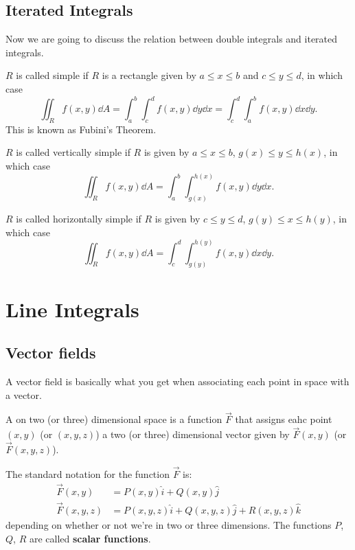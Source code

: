 \section{Iterated Integrals}
Now we are going to discuss the relation between double integrals and iterated integrals.

$R$ is called simple if $R$ is a rectangle given by $a\le x\le b$ and $c\le y\le d$, in which case
\[ \iint_Rf(x,y)\dd{A}=\int_a^b\int_c^df(x,y)\dd{y}\dd{x}=\int_c^d\int_a^bf(x,y)\dd{x}\dd{y}. \]
This is known as Fubini's Theorem.

$R$ is called vertically simple if $R$ is given by $a\le x\le b$, $g(x)\le y\le h(x)$, in which case
\[ \iint_Rf(x,y)\dd{A}=\int_a^b\int_{g(x)}^{h(x)}f(x,y)\dd{y}\dd{x}. \]

$R$ is called horizontally simple if $R$ is given by $c\le y\le d$, $g(y)\le x\le h(y)$, in which case
\[ \iint_Rf(x,y)\dd{A}=\int_c^d\int_{g(y)}^{h(y)}f(x,y)\dd{x}\dd{y}. \]

\pagebreak

\chapter{Line Integrals}
\section{Vector fields}
A vector field is basically what you get when associating each point in space with a vector.

\begin{definition}
A  on two (or three) dimensional space is a function $\vec{F}$ that assigns eahc point $(x,y)$ (or $(x,y,z)$) a two (or three) dimensional vector given by $\vec{F}(x,y)$ (or $\vec{F}(x,y,z)$).
\end{definition}

The standard notation for the function $\vec{F}$ is:
\begin{align*}
\vec{F}(x,y) &= P(x,y)\hat{i} + Q(x,y)\hat{j} \\
\vec{F}(x,y,z) &= P(x,y,z)\hat{i} + Q(x,y,z)\hat{j} + R(x,y,z)\hat{k}
\end{align*}
depending on whether or not we're in two or three dimensions. The functions $P$, $Q$, $R$ are called \textbf{scalar functions}.

